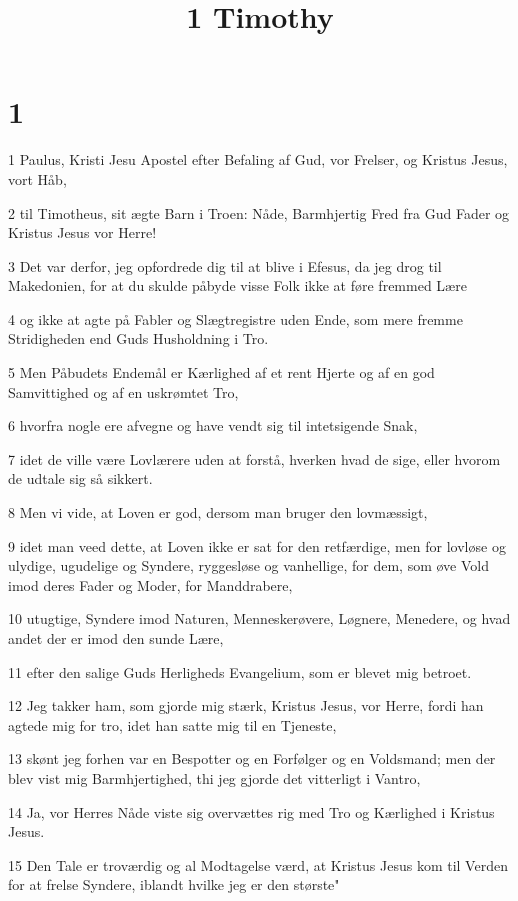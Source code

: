 

\title{1 Timothy}


\chapter{1}

\par 1 Paulus, Kristi Jesu Apostel efter Befaling af Gud, vor Frelser, og Kristus Jesus, vort Håb,
\par 2 til Timotheus, sit ægte Barn i Troen: Nåde, Barmhjertig Fred fra Gud Fader og Kristus Jesus vor Herre!
\par 3 Det var derfor, jeg opfordrede dig til at blive i Efesus, da jeg drog til Makedonien, for at du skulde påbyde visse Folk ikke at føre fremmed Lære
\par 4 og ikke at agte på Fabler og Slægtregistre uden Ende, som mere fremme Stridigheden end Guds Husholdning i Tro.
\par 5 Men Påbudets Endemål er Kærlighed af et rent Hjerte og af en god Samvittighed og af en uskrømtet Tro,
\par 6 hvorfra nogle ere afvegne og have vendt sig til intetsigende Snak,
\par 7 idet de ville være Lovlærere uden at forstå, hverken hvad de sige, eller hvorom de udtale sig så sikkert.
\par 8 Men vi vide, at Loven er god, dersom man bruger den lovmæssigt,
\par 9 idet man veed dette, at Loven ikke er sat for den retfærdige, men for lovløse og ulydige, ugudelige og Syndere, ryggesløse og vanhellige, for dem, som øve Vold imod deres Fader og Moder, for Manddrabere,
\par 10 utugtige, Syndere imod Naturen, Menneskerøvere, Løgnere, Menedere, og hvad andet der er imod den sunde Lære,
\par 11 efter den salige Guds Herligheds Evangelium, som er blevet mig betroet.
\par 12 Jeg takker ham, som gjorde mig stærk, Kristus Jesus, vor Herre, fordi han agtede mig for tro, idet han satte mig til en Tjeneste,
\par 13 skønt jeg forhen var en Bespotter og en Forfølger og en Voldsmand; men der blev vist mig Barmhjertighed, thi jeg gjorde det vitterligt i Vantro,
\par 14 Ja, vor Herres Nåde viste sig overvættes rig med Tro og Kærlighed i Kristus Jesus.
\par 15 Den Tale er troværdig og al Modtagelse værd, at Kristus Jesus kom til Verden for at frelse Syndere, iblandt hvilke jeg er den største"
